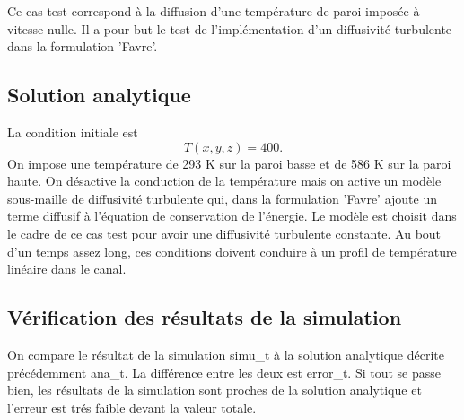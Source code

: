 Ce cas test correspond \`a la diffusion d'une temp\'erature de paroi impos\'ee \`a vitesse nulle. Il a pour but le test de l'impl\'ementation d'un diffusivit\'e turbulente dans la formulation 'Favre'.

\subsection{Solution analytique}

La condition initiale est
\begin{equation}
T\left(x,y,z\right) = 400.
\end{equation}
On impose une temp\'erature de 293 K sur la paroi basse et de 586 K sur la paroi haute.
On d\'esactive la conduction de la temp\'erature mais on active un mod\`ele sous-maille de diffusivit\'e turbulente qui, dans la formulation 'Favre' ajoute un terme diffusif \`a l'\'equation de conservation de l'\'energie.
Le mod\`ele est choisit dans le cadre de ce cas test pour avoir une diffusivit\'e turbulente constante.
Au bout d'un temps assez long, ces conditions doivent conduire \`a un profil de temp\'erature lin\'eaire dans le canal.

\subsection{V\'erification des r\'esultats de la simulation}

On compare le r\'esultat de la simulation {\textsf simu\_t} \`a la solution analytique d\'ecrite pr\'ec\'edemment {\textsf ana\_t}. La diff\'erence entre les deux est \textsf{error\_t}. Si tout se passe bien, les r\'esultats de la simulation sont proches de la solution analytique et l'erreur est tr\'es faible devant la valeur totale.


